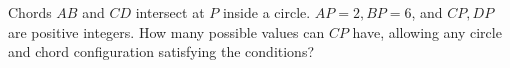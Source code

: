 Chords $AB$ and $CD$ intersect at $P$ inside a circle. $AP=2,BP=6$, and $CP,DP$ are positive integers. How many possible values can $CP$ have, allowing any circle and chord configuration satisfying the conditions?

